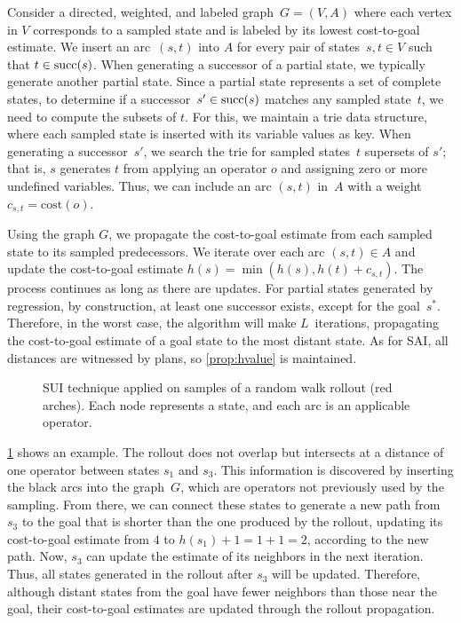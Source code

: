 
Consider a directed, weighted, and labeled graph~$G=(V,A)$ where each vertex in $V$ corresponds to a sampled state and is labeled by its lowest cost-to-goal estimate. We insert an arc~$(s,t)$ into $A$ for every pair of states~$s,t \in V$ such that $t \in \operatorname{succ}(s)$. When generating a successor of a partial state, we typically generate another partial state. Since a partial state represents a set of complete states, to determine if a successor~$s' \in \operatorname{succ}(s)$ matches any sampled state~$t$, we need to compute the subsets of $t$. For this, we maintain a trie data structure, where each sampled state is inserted with its variable values as key. When generating a successor~$s'$, we search the trie for sampled states~$t$ supersets of $s'$; that is, $s$ generates $t$ from applying an operator $o$ and assigning zero or more undefined variables. Thus, we can include an arc $(s, t)$ in~$A$ with a weight~$c_{s,t} = \text{cost}(o)$.

Using the graph $G$, we propagate the cost-to-goal estimate from each sampled state to its sampled predecessors. We iterate over each arc $(s,t) \in A$ and update the cost-to-goal estimate $h(s) = \min(h(s), h(t)+c_{s,t})$. The process continues as long as there are updates. For partial states generated by regression, by construction, at least one successor exists, except for the goal~$s^*$. Therefore, in the worst case, the algorithm will make $L$~iterations, propagating the cost-to-goal estimate of a goal state to the most distant state. As for SAI, all distances are witnessed by plans, so \cref{prop:hvalue} is maintained.

\begin{figure}[tb]
    \caption[SUI technique applied to samples of a random walk rollout.]{SUI technique applied on samples of a random walk rollout (red arches). Each node represents a state, and each arc is an applicable operator.}
    \label{fig:sui}
    \addmargin
    \centering
    
\end{figure}

\cref{fig:sui} shows an example. The rollout does not overlap but intersects at a distance of one operator between states $s_1$ and $s_3$. This information is discovered by inserting the black arcs into the graph~$G$, which are operators not previously used by the sampling. From there, we can connect these states to generate a new path from $s_3$ to the goal that is shorter than the one produced by the rollout, updating its cost-to-goal estimate from $4$ to $h(s_1)+1=1+1=2$, according to the new path. Now, $s_3$ can update the estimate of its neighbors in the next iteration. Thus, all states generated in the rollout after $s_3$ will be updated. Therefore, although distant states from the goal have fewer neighbors than those near the goal, their cost-to-goal estimates are updated through the rollout propagation.

